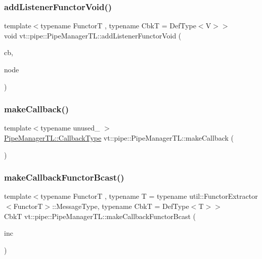 \subsubsection{\texorpdfstring{add\+Listener\+Functor\+Void()}{addListenerFunctorVoid()}\hspace{0.1cm}{\footnotesize\ttfamily [2/2]}}
{\footnotesize\ttfamily template$<$typename FunctorT , typename CbkT  = Def\+Type$<$\+V$>$$>$ \\
void vt\+::pipe\+::\+Pipe\+Manager\+T\+L\+::add\+Listener\+Functor\+Void (\begin{DoxyParamCaption}\item[{CbkT const \&}]{cb,  }\item[{\hyperlink{namespacevt_a866da9d0efc19c0a1ce79e9e492f47e2}{Node\+Type} const \&}]{node }\end{DoxyParamCaption})}

\mbox{\label{structvt_1_1pipe_1_1_pipe_manager_t_l_aff965bd75d398d45ad11d33feeb7a7c5}} 
\subsubsection{\texorpdfstring{make\+Callback()}{makeCallback()}}
{\footnotesize\ttfamily template$<$typename unused\+\_\+ $>$ \\
\hyperlink{structvt_1_1pipe_1_1_pipe_manager_t_l_a1cc1d0f1c80a36488f9b5d282e9755d2}{Pipe\+Manager\+T\+L\+::\+Callback\+Type} vt\+::pipe\+::\+Pipe\+Manager\+T\+L\+::make\+Callback (\begin{DoxyParamCaption}{ }\end{DoxyParamCaption})}

\mbox{\label{structvt_1_1pipe_1_1_pipe_manager_t_l_ac5ba44c5897bd1ecfb6f360f5da0a703}} 
\subsubsection{\texorpdfstring{make\+Callback\+Functor\+Bcast()}{makeCallbackFunctorBcast()}\hspace{0.1cm}{\footnotesize\ttfamily [1/2]}}
{\footnotesize\ttfamily template$<$typename FunctorT , typename T  = typename util\+::\+Functor\+Extractor$<$\+Functor\+T$>$\+::\+Message\+Type, typename CbkT  = Def\+Type$<$\+T$>$$>$ \\
CbkT vt\+::pipe\+::\+Pipe\+Manager\+T\+L\+::make\+Callback\+Functor\+Bcast (\begin{DoxyParamCaption}\item[{bool const \&}]{inc }\end{DoxyParamCaption})}

